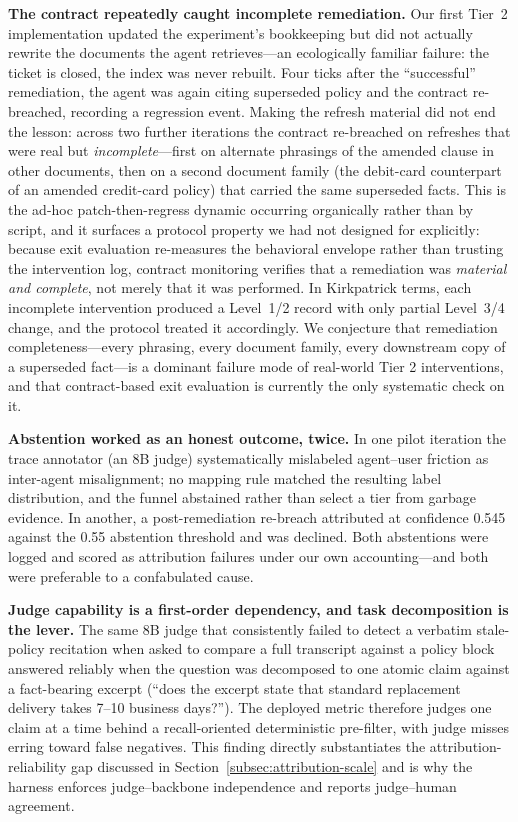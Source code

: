 \documentclass[conference]{IEEEtran}
\begin{document}
\textbf{The contract repeatedly caught incomplete remediation.} Our first
Tier~2 implementation updated the experiment's bookkeeping but did not
actually rewrite the documents the agent retrieves---an ecologically familiar
failure: the ticket is closed, the index was never rebuilt. Four ticks after
the ``successful'' remediation, the agent was again citing superseded policy
and the contract re-breached, recording a regression event. Making the refresh
material did not end the lesson: across two further iterations the contract
re-breached on refreshes that were real but \emph{incomplete}---first on
alternate phrasings of the amended clause in other documents, then on a second
document family (the debit-card counterpart of an amended credit-card policy)
that carried the same superseded facts. This is the ad-hoc patch-then-regress
dynamic occurring organically rather than by script, and it surfaces a protocol property we had not designed for
explicitly: because exit evaluation re-measures the behavioral envelope rather
than trusting the intervention log, contract monitoring verifies that a
remediation was \emph{material and complete}, not merely that it was
performed. In Kirkpatrick terms, each incomplete intervention produced a
Level~1/2 record with only partial Level~3/4 change, and the protocol treated
it accordingly. We conjecture that remediation completeness---every phrasing,
every document family, every downstream copy of a superseded fact---is a
dominant failure mode of real-world Tier 2 interventions, and that
contract-based exit evaluation is currently the only systematic check on it.

\textbf{Abstention worked as an honest outcome, twice.} In one pilot iteration
the trace annotator (an 8B judge) systematically mislabeled agent--user
friction as inter-agent misalignment; no mapping rule matched the resulting
label distribution, and the funnel abstained rather than select a tier from
garbage evidence. In another, a post-remediation re-breach attributed at
confidence 0.545 against the 0.55 abstention threshold and was declined. Both
abstentions were logged and scored as attribution failures under our own
accounting---and both were preferable to a confabulated cause.

\textbf{Judge capability is a first-order dependency, and task decomposition
is the lever.} The same 8B judge that consistently failed to detect a verbatim
stale-policy recitation when asked to compare a full transcript against a
policy block answered reliably when the question was decomposed to one atomic
claim against a fact-bearing excerpt (``does the excerpt state that standard
replacement delivery takes 7--10 business days?''). The deployed metric
therefore judges one claim at a time behind a recall-oriented deterministic
pre-filter, with judge misses erring toward false negatives. This finding
directly substantiates the attribution-reliability gap discussed in
Section~\ref{subsec:attribution-scale} and is why the harness enforces
judge--backbone independence and reports judge--human agreement.
\end{document}

